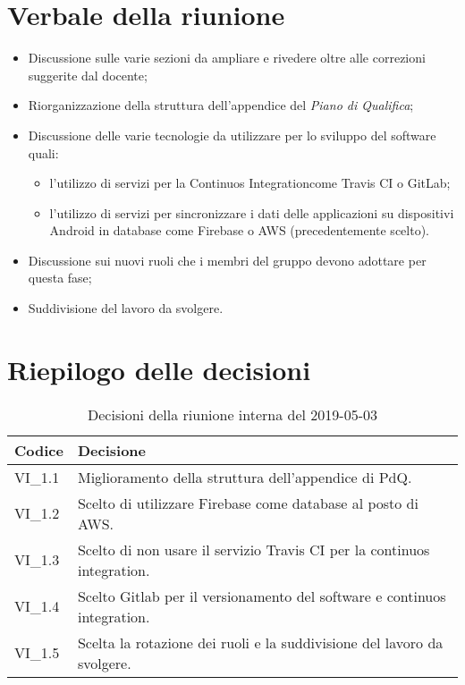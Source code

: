 \section{Verbale della riunione}
\begin{itemize}
	\item Discussione sulle varie sezioni da ampliare e rivedere oltre alle correzioni suggerite dal docente;
	\item Riorganizzazione della struttura dell'appendice del \textit{Piano di Qualifica};
	\item Discussione delle varie tecnologie da utilizzare per lo sviluppo del software quali:
		\begin{itemize}
			\item l'utilizzo di servizi per la Continuos Integration\glosp come Travis CI o GitLab\glo;
			\item l'utilizzo di servizi per sincronizzare i dati delle applicazioni su dispositivi Android in database come Firebase o AWS (precedentemente scelto).
		\end{itemize}
	\item Discussione sui nuovi ruoli che i membri del gruppo devono adottare per questa fase;
	\item Suddivisione del lavoro da svolgere.

\end{itemize} 
\pagebreak
\section{Riepilogo delle decisioni}

	
	\begin{longtable}{ >{\centering}p{} >{}p{}}
		\caption{Decisioni della riunione interna del 2019-05-03}\\	
		\rowcolorhead
		\textbf{\color{white}Codice} 
		& \centering\textbf{\color{white}Decisione} 
		\tabularnewline 
		\endfirsthead
		VI\_1.1 & Miglioramento della struttura dell'appendice di PdQ.
		
		\tabularnewline 
		VI\_1.2 & Scelto di utilizzare Firebase come database al posto di AWS.
		
		\tabularnewline 
		VI\_1.3 & Scelto di non usare il servizio Travis CI per la continuos integration.
	
		\tabularnewline 
		VI\_1.4 & Scelto Gitlab per il versionamento del software e continuos integration.
		
		\tabularnewline 
		VI\_1.5 & Scelta la rotazione dei ruoli e la suddivisione del lavoro da svolgere.
	
	\end{longtable}
	




